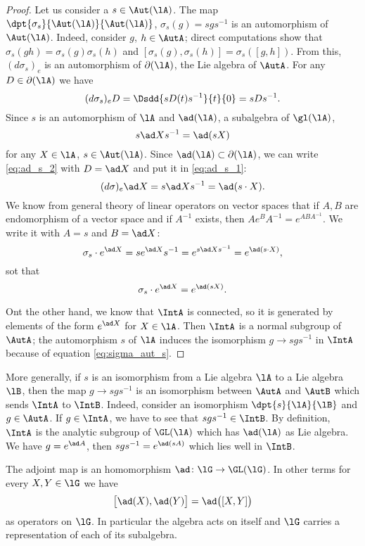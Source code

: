 \begin{proof}
Let us consider a $s\in\Aut(\lA)$. The map $\dpt{\sigma_s}{\Aut(\lA)}{\Aut(\lA)}$, $\sigma_s(g)=sgs^{-1}$ is an automorphism of $\Aut(\lA)$. Indeed, consider $g$, $h\in\AutA$; direct computations show that $\sigma_s(gh)=\sigma_s(g)\sigma_s(h)$ and $[\sigma_s(g),\sigma_s(h)]=\sigma_s([g,h])$. From this, $(d\sigma_s)_e$ is an automorphism of $\partial(\lA)$, the Lie algebra of $\AutA$. For any $D\in\partial(\lA)$ we have
\begin{equation}\label{eq:ad_s_2}
 (d\sigma_s)_eD=\Dsdd{ sD(t)s^{-1} }{t}{0}
             =sDs^{-1}. 
\end{equation}
Since $s$ is an automorphism of $\lA$ and $\ad(\lA)$, a subalgebra of $\gl(\lA)$,
\begin{equation}\label{eq:ad_s_1}
  s\ad Xs^{-1}=\ad(sX)
\end{equation}
for any $X\in\lA$, $s\in\Aut(\lA)$. Since $\ad(\lA)\subset\partial(\lA)$, we can write \eqref{eq:ad_s_2} with $D=\ad X$ and put it in \eqref{eq:ad_s_1}: 
\[
   (d\sigma)_e\ad X=s\ad Xs^{-1}=\ad(s\cdot X).
\]
We know from general theory of linear operators on vector spaces that if $A,B$ are endomorphism of a vector space and if $A^{-1}$ exists, then $Ae^BA^{-1}=e^{ABA^{-1}}$. We write it with $A=s$ and $B=\ad X$: 
\[
  \sigma_s\cdot e^{\ad X}=se^{\ad X}s^{-1}=e^{s\ad Xs^{-1}}=e^{\ad(s\cdot X)},
\]
sot that 
\begin{equation}\label{eq:sigma_aut_s}
  \sigma_s\cdot e^{\ad X}=e^{\ad(s X)}.
\end{equation}

Ont the other hand, we know that $\IntA$ is connected, so it is generated by elements of the form $e^{\ad X}$ for $X\in\lA$. Then $\IntA$ is a normal subgroup of $\AutA$; the automorphism $s$ of $\lA$ induces the isomorphism $g\to sgs^{-1}$ in $\IntA$ because of equation \eqref{eq:sigma_aut_s}.
\end{proof}

More generally, if $s$ is an isomorphism from a Lie algebra $\lA$ to a Lie algebra $\lB$, then the map $g\to sgs^{-1}$ is an isomorphism between $\AutA$ and $\AutB$ which sends $\IntA$ to $\IntB$. Indeed, consider an isomorphism $\dpt{s}{\lA}{\lB}$ and $g\in\AutA$. If $g\in\IntA$, we have to see that $sgs^{-1}\in\IntB$. By definition, $\IntA$ is the analytic subgroup of $\GL(\lA)$ which has $\ad(\lA)$ as Lie algebra. We have $g=e^{\ad A}$, then $sgs^{-1}=e^{\ad(sA)}$ which lies well in $\IntB$.

\begin{lemma}       \label{LemadhomomadXadYadXY}
    The adjoint map is an homomorphism \( \ad\colon \lG\to \GL(\lG)\). In other terms for every \( X,Y\in\lG\) we have
    \begin{equation}
        \big[ \ad(X),\ad(Y) \big]=\ad\big( [X,Y] \big)
    \end{equation}
    as operators on \( \lG\). In particular the algebra acts on itself and \( \lG\) carries a representation of each of its subalgebra.
\end{lemma}

